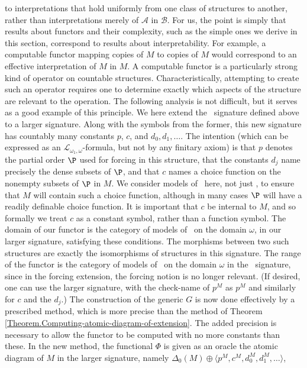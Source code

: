 \documentclass{amsart}
\begin{document}
to interpretations that hold uniformly from one class of structures to another,
rather than interpretations merely of $\mathcal A$ in $\mathcal B$.
For us, the point is simply
that results about functors and their complexity, such as the simple ones
we derive in this section, correspond to results about interpretability.
For example, a computable functor mapping copies of $M$ to copies
of $M$ would correspond to an effective interpretation of $M$ in $M$.
A computable functor is a particularly strong kind of operator on countable structures.
Characteristically, attempting to create such an operator requires one to determine
exactly which aspects of the structure are relevant to the operation.
The following analysis is not difficult, but it serves as a good example of this principle.
We here extend the \Levy\ signature defined above to a larger signature.
Along with the symbols from the former, this new signature has countably many
constants $p$, $c$, and $d_0,d_1,\ldots$.
The intention (which can be expressed
as an $\mathcal{L}_{\omega_1,\omega}$-formula, but not by any finitary axiom) is that
$p$ denotes the partial order $\P$ used for forcing in this structure,
that the constants $d_j$ name precisely the dense subsets of $\P$,
and that $c$ names a choice function on the nonempty subsets of $\P$ in $M$.
We consider models of \ZFC\ here, not just \ZF, to ensure that $M$ will
contain such a choice function, although in many cases $\P$ will
have a readily definable choice function.
It is important
that $c$ be internal to $M$, and so formally we treat $c$ as a constant symbol,
rather than a function symbol.
The domain of our functor is the category of models of \ZFC\ on the domain $\omega$,
in our larger signature, satisfying these conditions.
The morphisms between two such structures are exactly the isomorphisms of structures
in this signature.
The range of the functor is the category of models of \ZFC\ on the
domain $\omega$ in the \Levy\ signature, since in the forcing extension,
the forcing notion is no longer relevant.
(If desired, one can use the larger signature, with the check-name of $p^M$ as $p^{M}$ and similarly for $c$ and the $d_j$.)
The construction of the generic $G$ is now done effectively by a prescribed method, which is
more precise than the method of Theorem \ref{Theorem.Computing-atomic-diagram-of-extension}.
The added precision is necessary to allow the functor to be computed with no more constants than these.
In the new method, the functional $\Phi$ is given as an oracle the atomic diagram of $M$
in the larger signature, namely $\Delta_0(M)\oplus\langle p^M,c^M,d_0^M,d_1^M,\ldots\rangle$,
\end{document}
